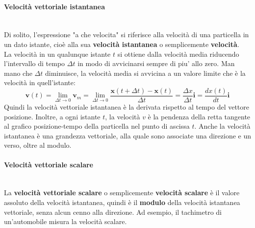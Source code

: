 \documentclass[12pt]{report}
\begin{document}
	\paragraph{Velocità vettoriale istantanea} \quad \\
	Di solito, l'espressione "a che velocita" si riferisce alla velocità di una particella in un dato istante, cioè  alla sua \textbf{velocità istantanea} o semplicemente \textbf{velocità}. \\
	La velocità in un qualunque istante $t$ si ottiene dalla velocità media riducendo l'intervallo di tempo $\Delta t$ in modo di avvicinarsi sempre di piu' allo zero. Man mano che $\Delta t$ diminuisce, la velocità media si avvicina a un valore limite che è  la velocità in quell'istante:
	\[
	\mathbf{v}(t) = \lim_{\Delta t\to 0}\mathbf{v}_m = \lim_{\Delta t \to 0} \frac{\mathbf{x}(t + \Delta t) - \mathbf{x}(t)}{\Delta t} = \frac{\Delta x}{\Delta t}\mathbf{i} = \frac{dx(t)}{dt}\mathbf{i}
	\]
	Quindi la velocità vettoriale istantanea è  la derivata rispetto al tempo del vettore posizione. Inoltre, a ogni istante $t$, la velocità $v$ è  la pendenza della retta tangente al grafico posizione-tempo della particella nel punto di ascissa $t$. Anche la velocità istantanea è  una grandezza vettoriale, alla quale sono associate una direzione e un verso, oltre al modulo. \\
	\paragraph{Velocità vettoriale scalare} \quad \\
	La \textbf{velocità vettoriale scalare} o semplicemente \textbf{velocità scalare} è  il valore assoluto della velocità istantanea, quindi è  il \textbf{modulo} della velocità istantanea vettoriale, senza alcun cenno alla direzione. Ad esempio, il tachimetro di un'automobile misura la velocità scalare.
\end{document}
